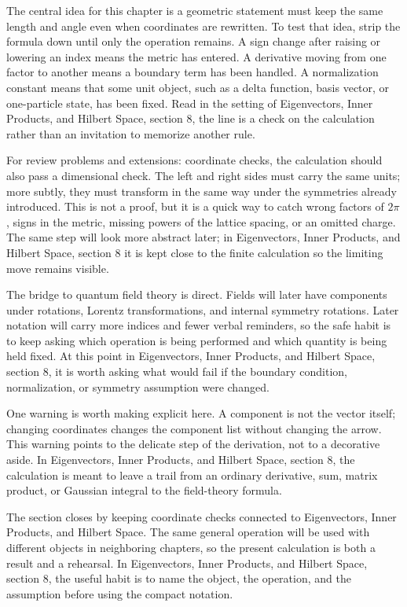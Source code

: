 The central idea for this chapter is a geometric statement must keep the same length and angle even when coordinates are rewritten.  To test that idea, strip the formula down until only the operation remains.  A sign change after raising or lowering an index means the metric has entered.  A derivative moving from one factor to another means a boundary term has been handled.  A normalization constant means that some unit object, such as a delta function, basis vector, or one-particle state, has been fixed.  Read in the setting of Eigenvectors, Inner Products, and Hilbert Space, section 8, the line is a check on the calculation rather than an invitation to memorize another rule.

For review problems and extensions: coordinate checks, the calculation should also pass a dimensional check.  The left and right sides must carry the same units; more subtly, they must transform in the same way under the symmetries already introduced.  This is not a proof, but it is a quick way to catch wrong factors of \(2\pi\), signs in the metric, missing powers of the lattice spacing, or an omitted charge.  The same step will look more abstract later; in Eigenvectors, Inner Products, and Hilbert Space, section 8 it is kept close to the finite calculation so the limiting move remains visible.

The bridge to quantum field theory is direct.  Fields will later have components under rotations, Lorentz transformations, and internal symmetry rotations.  Later notation will carry more indices and fewer verbal reminders, so the safe habit is to keep asking which operation is being performed and which quantity is being held fixed.  At this point in Eigenvectors, Inner Products, and Hilbert Space, section 8, it is worth asking what would fail if the boundary condition, normalization, or symmetry assumption were changed.

One warning is worth making explicit here.  A component is not the vector itself; changing coordinates changes the component list without changing the arrow.  This warning points to the delicate step of the derivation, not to a decorative aside.  In Eigenvectors, Inner Products, and Hilbert Space, section 8, the calculation is meant to leave a trail from an ordinary derivative, sum, matrix product, or Gaussian integral to the field-theory formula.

The section closes by keeping coordinate checks connected to Eigenvectors, Inner Products, and Hilbert Space.  The same general operation will be used with different objects in neighboring chapters, so the present calculation is both a result and a rehearsal.  In Eigenvectors, Inner Products, and Hilbert Space, section 8, the useful habit is to name the object, the operation, and the assumption before using the compact notation.



